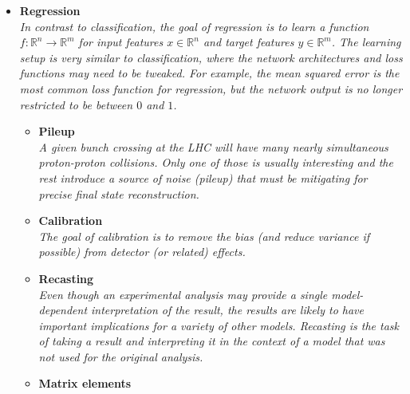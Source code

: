 \documentclass[12pt,letterpaper]{article}
\begin{document}
\begin{itemize}
\item \textbf{Regression}
\\\textit{In contrast to classification, the goal of regression is to learn a function $f:\mathbb{R}^n\rightarrow\mathbb{R}^m$ for input features $x\in\mathbb{R}^n$ and target features $y\in\mathbb{R}^m$.  The learning setup is very similar to classification, where the network architectures and loss functions may need to be tweaked.  For example, the mean squared error is the most common loss function for regression, but the network output is no longer restricted to be between $0$ and $1$.}
	\begin{itemize}
		\item \textbf{Pileup}~\cite{Komiske:2017ubm,ATL-PHYS-PUB-2019-028,Martinez:2018fwc,Carrazza:2019efs,Maier:2021ymx,Li:2022omf}
		\\\textit{A given bunch crossing at the LHC will have many nearly simultaneous proton-proton collisions.  Only one of those is usually interesting and the rest introduce a source of noise (pileup) that must be mitigating for precise final state reconstruction.}
		\item \textbf{Calibration}~\cite{Cheong:2019upg,ATL-PHYS-PUB-2020-001,ATL-PHYS-PUB-2018-013,Hooberman:DLPS2017,Kasieczka:2020vlh,Sirunyan:2019wwa,Baldi:2020hjm,Du:2020pmp,Kieseler:2021jxc,Pollard:2021fqv,Akchurin:2021afn,Kieseler:2020wcq,Akchurin:2021ahx,Diefenthaler:2021rdj,Polson:2021kvr,Micallef:2021src,Arratia:2021tsq,Kronheim:2021hdb,Renteria-Estrada:2021zrd,Pata:2022wam,Chadeeva:2022kay,Dorigo:2022tfi,Alves:2022gnw,Qiu:2022xvr,Akchurin:2022apq,Gambhir:2022gua,Gambhir:2022dut,Valsecchi:2022rla,Leigh:2022lpn,Darulis:2022brn,Ge:2022xrv}
		\\\textit{The goal of calibration is to remove the bias (and reduce variance if possible) from detector (or related) effects.}
		\item \textbf{Recasting}~\cite{Caron:2017hku,Bertone:2016mdy,1806026,Hammad:2022wpq}
		\\\textit{Even though an experimental analysis may provide a single model-dependent interpretation of the result, the results are likely to have important implications for a variety of other models.  Recasting is the task of taking a result and interpreting it in the context of a model that was not used for the original analysis.}
		\item \textbf{Matrix elements}~\cite{Badger:2020uow,Bishara:2019iwh,1804325,Bury:2020ewi,Sombillo:2021yxe,Sombillo:2021rxv,Aylett-Bullock:2021hmo,Maitre:2021uaa,Danziger:2021eeg,Winterhalder:2021ngy,Karl:2022jda,Alnuqaydan:2022ncd,Dersy:2022bym}

\end{itemize}
\end{itemize}
\end{document}
